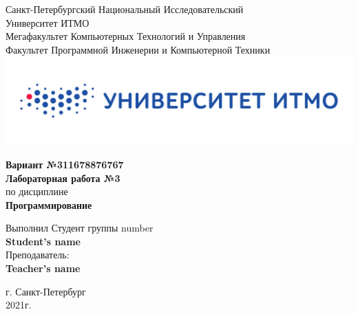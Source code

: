 \documentclass[12pt,onecolumn]{article}
\begin{document}
\setcounter{tocdepth}{4}
\begin{center}
    Санкт-Петербургский Национальный Исследовательский\\ 
    Университет ИТМО\\
    Мегафакультет Компьютерных Технологий и Управления\\
    Факультет Программной Инженерии и Компьютерной Техники \\
    \includegraphics[scale=0.3]{itm.jpg} %
\end{center}
\vspace{1cm}


\begin{center}
    \large \textbf{Вариант №311678876767}\\
    \textbf{Лабораторная работа №3}\\
    по дисциплине\\
    \textbf{Программирование}
\end{center}

\vspace{2cm}

\begin{flushright}
  Выполнил Студент  группы number\\
  \textbf{Student's name}\\
  Преподаватель: \\
  \textbf{Teacher's name}\\
\end{flushright}

\vspace{10cm}
\begin{center}
    г. Санкт-Петербург\\
    2021г.
\end{center}
\newpage
\tableofcontents
\newpage
\end{document}
